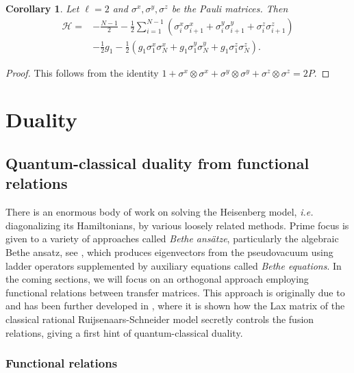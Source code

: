 \documentclass[11pt]{report}
\newtheorem{corollary}[theorem]{Corollary}
\theoremstyle{definition}
\theoremstyle{remark}
\theoremstyle{remark}
\begin{document}
\begin{corollary}
Let $\ell = 2$ and $\sigma^x,\sigma^y,\sigma^z$ be the Pauli matrices. Then
\begin{align*}
\mathcal{H} = &- \frac{N-1}{2} - \frac{1}{2} \sum_{i=1}^{N-1} \left( \sigma_i^x \sigma_{i+1}^x + \sigma_i^y \sigma_{i+1}^y + \sigma_i^z \sigma_{i+1}^z \right) \\
&- \frac{1}{2} g_1 - \frac{1}{2} \left( g_1\sigma_1^x \sigma_N^x + g_1 \sigma_1^y \sigma_N^y + g_1 \sigma_1^z \sigma_N^z \right).
\end{align*}
\end{corollary}

\begin{proof}
This follows from the identity $1 + \sigma^x \otimes \sigma^x + \sigma^y \otimes \sigma^y + \sigma^z \otimes \sigma^z = 2P$.
\end{proof}


\chapter{Duality} \label{chapter:duality}

\section{Quantum-classical duality from functional relations}

There is an enormous body of work on solving the Heisenberg model, \emph{i.e.} diagonalizing its Hamiltonians, by various loosely related methods. Prime focus is given to a variety of approaches called \emph{Bethe ansätze}, particularly the algebraic Bethe ansatz, see \cite{book:arutyunov:betheAnsatz}, which produces eigenvectors from the pseudovacuum using ladder operators supplemented by auxiliary equations called \emph{Bethe equations}. In the coming sections, we will focus on an orthogonal approach employing functional relations between transfer matrices. This approach is originally due to \cite{article:kuniba:1994} and has been further developed in \cite{book:arutyunov:betheAnsatz}, where it is shown how the Lax matrix of the classical rational Ruijsenaars-Schneider model secretly controls the fusion relations, giving a first hint of quantum-classical duality.

\subsection{Functional relations}
\end{document}
